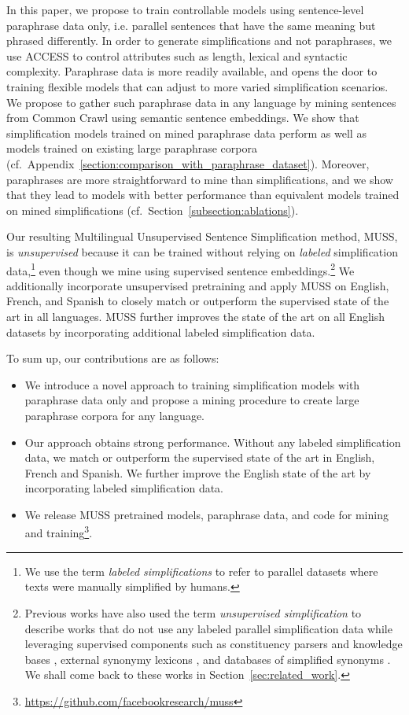 \documentclass[11pt]{article}
\newcommand{\muss}{\textsc{MUSS}\xspace}
\newcommand{\access}{\mbox{\textsc{ACCESS}}\xspace}
\begin{document}
In this paper, we propose to train controllable models using sentence-level paraphrase data only, i.e. parallel sentences that have the same meaning but phrased differently.
In order to generate simplifications and not paraphrases, we use \access \cite{martin2020controllable} to control attributes such as length, lexical and syntactic complexity.
Paraphrase data is more readily available, and opens the door to training flexible models that can adjust to more varied simplification scenarios.
We propose to gather such paraphrase data in any language by mining sentences from Common Crawl using semantic sentence embeddings.
We show that simplification models trained on mined paraphrase data perform as well as models trained on existing large paraphrase corpora (cf.~Appendix~\ref{section:comparison_with_paraphrase_dataset}). Moreover, paraphrases  are  more straightforward to mine than simplifications, and we show that they lead to models with better performance than equivalent models trained on mined simplifications (cf.~Section~\ref{subsection:ablations}).

Our resulting Multilingual Unsupervised Sentence Simplification method, \muss, is \textit{unsupervised} because it can be trained without relying on {\em labeled} simplification data,\footnote{We use the term {\em labeled simplifications} to refer to parallel datasets where texts were manually simplified by humans.} even though we mine using supervised sentence embeddings.\footnote{Previous works have also used the term {\em unsupervised simplification} to describe works that do not use any labeled parallel simplification data while leveraging supervised components such as constituency parsers and knowledge bases \citep{kumar-etal-2020-iterative}, external synonymy lexicons \cite{surya2018unsupervised}, and databases of simplified synonyms \cite{Zhao2020SemiSupervisedTS}. We shall come back to these works in Section~\ref{sec:related_work}.}
We additionally incorporate unsupervised pretraining  \cite{liu2019unsupervised,liu2020multilingual} and apply \muss on English, French, and Spanish to closely match or outperform the supervised state of the art in all languages. \muss further improves the state of the art on all English datasets by incorporating additional labeled simplification data.


To sum up, our contributions are as follows:
\begin{itemize}
    \item We introduce a novel approach to training simplification models with paraphrase data only and propose a mining procedure to create large paraphrase corpora for any language.
    \item Our approach obtains strong performance. Without any labeled simplification data, we match or outperform the supervised state of the art in English, French and Spanish. We further improve the English state of the art by incorporating labeled simplification data.
    \item We release \muss pretrained models, paraphrase data, and code for mining and training\footnote{\url{https://github.com/facebookresearch/muss}}.
\end{itemize}
\end{document}
